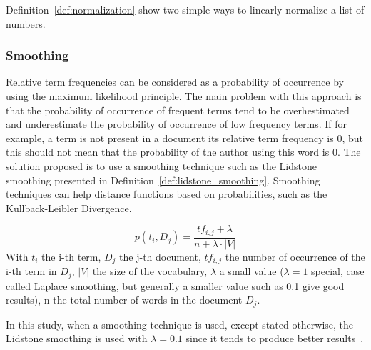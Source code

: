 Definition~\ref{def:normalization} show two simple ways to linearly normalize a list of numbers.

\subsubsection{Smoothing}

Relative term frequencies can be considered as a probability of occurrence by using the maximum likelihood principle.
The main problem with this approach is that the probability of occurrence of frequent terms tend to be overhestimated and underestimate the probability of occurrence of low frequency terms.
If for example, a term is not present in a document its relative term frequency is 0, but this should not mean that the probability of the author using this word is 0.
The solution proposed is to use a smoothing technique such as the Lidstone smoothing presented in Definition~\ref{def:lidstone_smoothing}.
Smoothing techniques can help distance functions based on probabilities, such as the Kullback-Leibler Divergence.~\cite{savoy_stylo}

\begin{definition}
  \label{def:lidstone_smoothing}
  \begin{equation}
    p(t_i, D_j) = \frac{tf_{i,j} + \lambda}{n + \lambda \cdot |V|}
  \end{equation}
  With $t_i$ the i-th term, $D_j$ the j-th document, $tf_{i,j}$ the number of occurrence of the i-th term in $D_j$, $|V|$ the size of the vocabulary, $\lambda$ a small value ($\lambda = 1$ special, case called Laplace smoothing, but generally a smaller value such as 0.1 give good results), n the total number of words in the document $D_j$.
\end{definition}

In this study, when a smoothing technique is used, except stated otherwise, the Lidstone smoothing is used with $\lambda = 0.1$ since it tends to produce better results~\cite{savoy_stylo}.
